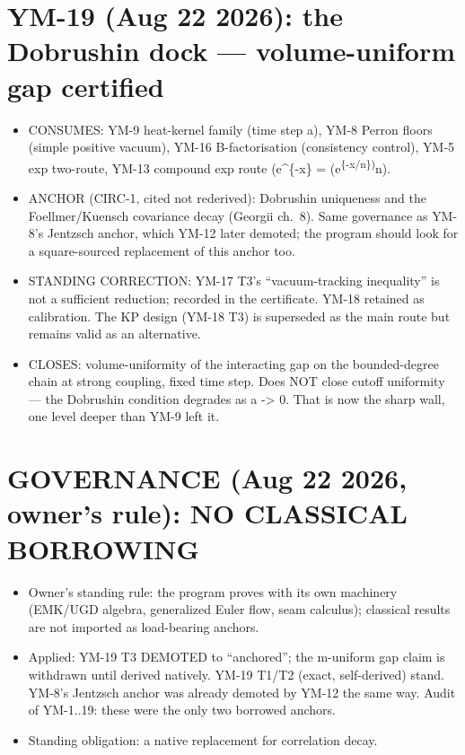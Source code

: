 \hypertarget{ym-19-aug-22-2026-the-dobrushin-dock-volume-uniform-gap-certified}{%
\section{YM-19 (Aug 22 2026): the Dobrushin dock --- volume-uniform gap certified}\label{ym-19-aug-22-2026-the-dobrushin-dock-volume-uniform-gap-certified}}

\begin{itemize}
\tightlist
\item
  CONSUMES: YM-9 heat-kernel family (time step a), YM-8 Perron floors
  (simple positive vacuum), YM-16 B-factorisation (consistency control),
  YM-5 exp two-route, YM-13 compound exp route (e\^{}\{-x\} = (e\textsuperscript{\{-x/n\})}n).
\item
  ANCHOR (CIRC-1, cited not rederived): Dobrushin uniqueness and the
  Foellmer/Kuensch covariance decay (Georgii ch.~8). Same governance as
  YM-8's Jentzsch anchor, which YM-12 later demoted; the program should
  look for a square-sourced replacement of this anchor too.
\item
  STANDING CORRECTION: YM-17 T3's ``vacuum-tracking inequality'' is not a
  sufficient reduction; recorded in the certificate. YM-18 retained as
  calibration. The KP design (YM-18 T3) is superseded as the main route
  but remains valid as an alternative.
\item
  CLOSES: volume-uniformity of the interacting gap on the bounded-degree
  chain at strong coupling, fixed time step. Does NOT close cutoff
  uniformity --- the Dobrushin condition degrades as a -\textgreater{} 0. That is now
  the sharp wall, one level deeper than YM-9 left it.
\end{itemize}

\hypertarget{governance-aug-22-2026-owners-rule-no-classical-borrowing}{%
\section{GOVERNANCE (Aug 22 2026, owner's rule): NO CLASSICAL BORROWING}\label{governance-aug-22-2026-owners-rule-no-classical-borrowing}}

\begin{itemize}
\tightlist
\item
  Owner's standing rule: the program proves with its own machinery
  (EMK/UGD algebra, generalized Euler flow, seam calculus); classical
  results are not imported as load-bearing anchors.
\item
  Applied: YM-19 T3 DEMOTED to ``anchored''; the m-uniform gap claim is
  withdrawn until derived natively. YM-19 T1/T2 (exact, self-derived)
  stand. YM-8's Jentzsch anchor was already demoted by YM-12 the same
  way. Audit of YM-1..19: these were the only two borrowed anchors.
\item
  Standing obligation: a native replacement for correlation decay.
\end{itemize}

